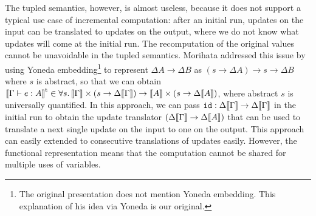 \documentclass{article}
\theoremstyle{definition}
\begin{document}
The tupled semantics, however, is almost useless, because it does not support a typical use case of incremental computation: 
after an initial run, updates on the input can be translated to updates on the output, where we do not know what updates will come at
the initial run. 
The recomputation of the original values cannot be unavoidable in the tupled semantics.
Morihata  addressed this issue by using Yoneda embedding\footnote{The original presentation does not mention Yoneda embedding. This explanation of his idea via Yoneda is our original.} to represent $\Delta A \to \Delta B$ as $(s \to \Delta A) \to s \to \Delta B$ where $s$ is abstract, 
so that we can obtain $\sem{ \Gamma \vdash e : A }^\mathrm{t} \in \forall s.\, \sem{\Gamma} \x (s \to \Delta \sem{\Gamma}) \to \sem{A} \x (s \to \Delta \sem{A})$, where abstract $s$ is universally quantified. 
In this approach, we can pass $\var{id} : \Delta \sem{\Gamma} \to \Delta \sem{\Gamma}$ in the initial run to obtain the update translator $(\Delta \sem{\Gamma} \to \Delta \sem{A})$ that can be 
used to translate a next single update on the input to one on the output. This approach can easily extended to consecutive translations of updates easily.
However, the functional representation means that the computation cannot be shared for multiple uses of variables. 
\end{document}
